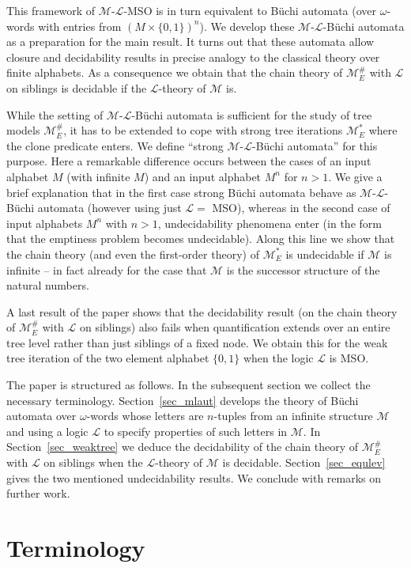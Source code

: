 \documentclass[copyright,creativecommons]{eptcs}
\theoremstyle{plain}
\theoremstyle{nonumberplain}
\newcommand{\m}{\ensuremath{\mathcal{M}}}
\newcommand{\el}{\ensuremath{\mathcal{L}}}
\newcommand{\ml}{\ensuremath{\m\textrm{-}\el}}
\newcommand{\MweakE}{\ensuremath{\m^{\#}_E}}
\newcommand{\MstrongE}{\ensuremath{\m^*_E}}
\begin{document}
This framework of \ml-MSO is in turn equivalent to B\"uchi automata (over 
$\omega$-words with entries from $(M \times \{0,1\})^n$). We develop these 
\ml-B\"uchi automata as a preparation for the main result. 
 It turns out that these automata allow 
closure and decidability results in precise analogy to the classical 
theory over finite alphabets. As a consequence we obtain that the chain theory of $\MweakE$ with $\el$ on siblings is decidable if the $\el$-theory of $\m$ is. 

While the setting of \ml-B\"uchi automata 
is sufficient for the study of tree models $\MweakE$, it has to be extended 
to cope with strong tree iterations $\MstrongE$ where the clone predicate
enters. We define ``strong \ml-B\"uchi automata'' for this purpose. 
Here a remarkable difference occurs between the cases of 
an input alphabet $M$ (with infinite $M$) and an input alphabet $M^n$ 
for $n>1$. We give a brief explanation that in the first case 
strong B\"uchi automata behave as \ml-B\"uchi automata (however
using just $\el =$ MSO), whereas in the second case of input alphabets $M^n$ with $n>1$, 
 undecidability phenomena enter (in the form that the emptiness 
 problem becomes undecidable). Along this line we show that the chain theory (and even the first-order theory) of $\MstrongE$ is undecidable if $\m$ is infinite -- in fact already for the case that $\m$ is the successor structure of the natural numbers.
  
A last result of the paper shows that the decidability result 
(on the chain theory of $\MweakE$ with $\el$ on siblings) 
also fails when quantification extends over an entire tree level 
rather than just siblings of a fixed node. We obtain this 
for the weak tree iteration of the two element alphabet $\{0,1\}$ 
when the logic $\el$ is MSO.   

The paper is structured as follows. In the subsequent section we 
collect the necessary terminology. Section~\ref{sec_mlaut} develops the theory 
of B\"uchi automata over $\omega$-words whose letters are 
$n$-tuples from an infinite structure $\m$ and using a logic $\el$ to specify 
properties of such letters in $\m$. 
In Section~\ref{sec_weaktree} we deduce the decidability 
of the chain theory of $\MweakE$ with $\el$ on siblings when the 
$\el$-theory of $\m$ is decidable. Section~\ref{sec_equlev} gives the two mentioned
undecidability results. We conclude with remarks on further work. 



\section{Terminology}\label{sec_term}
\end{document}
